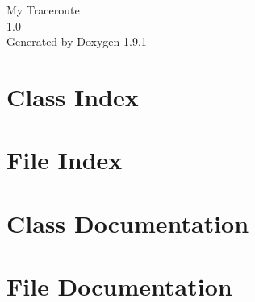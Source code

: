 \let\mypdfximage\pdfximage\def\pdfximage{\immediate\mypdfximage}\documentclass[twoside]{book}
\newcommand{\+}{\discretionary{\mbox{\scriptsize$\hookleftarrow$}}{}{}}
\newcommand{\clearemptydoublepage}{%
  \newpage{\pagestyle{empty}\cleardoublepage}%
}
\begin{document}
\raggedbottom

\hypersetup{pageanchor=false,
             bookmarksnumbered=true,
             pdfencoding=unicode
            }
\begin{titlepage}
\vspace*{7cm}
\begin{center}%
{\Large My Traceroute \\[1ex]\large 1.\+0 }\\
\vspace*{1cm}
{\large Generated by Doxygen 1.9.1}\\
\end{center}
\end{titlepage}
\clearemptydoublepage
{}
\tableofcontents
\clearemptydoublepage
{}
\hypersetup{pageanchor=true}

\chapter{Class Index}

\chapter{File Index}

\chapter{Class Documentation}





\chapter{File Documentation}


\backmatter
\newpage
{}
\clearemptydoublepage
{}
\printindex
\end{document}
